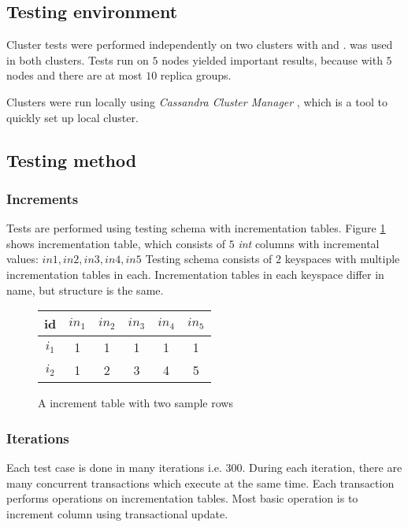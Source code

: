 \subsection{Testing environment}
Cluster tests were performed independently on two clusters with  and .  was used in both clusters.
Tests run on $5$ nodes yielded important results, because with $5$ nodes and  there are at most $10$ replica groups. 

Clusters were run locally using \emph{Cassandra Cluster Manager} \cite{ccm}, which is a tool to quickly set up local cluster.

\subsection{Testing method}

\subsubsection{Increments}
Tests are performed using testing schema with incrementation tables. Figure \ref{fig:incrementationTable} shows incrementation table, which consists of $5$  \emph{int} columns with incremental values: $in1,in2,in3,in4,in5$
Testing schema consists of $2$ keyspaces with multiple incrementation tables in each. Incrementation tables in each keyspace differ in name, but structure is the same.

\begin{figure}[h]
\centering
\begin{tabular}{c||c|c|c|c|c}
        \toprule
        id 		 & $in_{1}$ & $in_{2}$ & $in_{3}$ & $in_{4}$ & $in_{5}$ \\ \midrule
        $i_{1}$ & 1  & 1  & 1  &  1 & 1  \\
        $i_{2}$ & 1  & 2  & 3  &  4 & 5  \\ \bottomrule
      \end{tabular}
      \caption{A increment table with two sample rows}
  \label{fig:incrementationTable}
\end{figure}

\subsubsection{Iterations}
Each test case is done in many iterations i.e. $300$. During each iteration, there are many concurrent transactions which execute at the same time. Each transaction \transaction performs operations on incrementation tables. Most basic operation is to increment column using transactional update.


